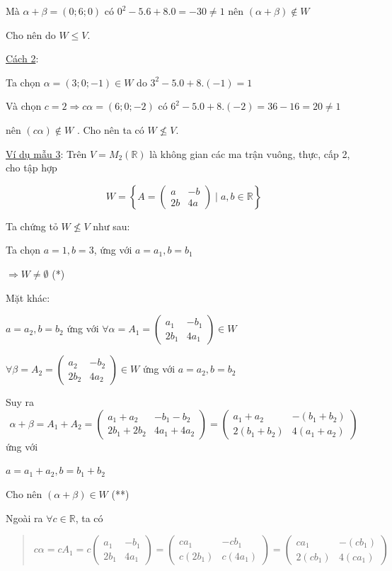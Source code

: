 \documentclass[12pt,a4paper]{article}
\begin{document}
Mà $\alpha + \beta = (0; 6; 0)$ có
$0^2 - 5.6 + 8.0 = -30 \neq 1$ nên
$(\alpha + \beta) \notin W$

Cho nên do $W \le V$.

\ul{Cách 2}:

Ta chọn $\alpha = (3; 0; -1) \in W$ do
$3^2 - 5.0 + 8.(-1) = 1$

Và chọn $c = 2 \Rightarrow c\alpha = (6; 0; -2)$ có
$6^2 - 5.0 + 8.(-2) = 36 - 16 = 20 \neq 1$

nên $(c\alpha) \notin W$ . Cho nên
ta có $W \not\le V$.

\ul{Ví dụ mẫu 3}: Trên
$V = M_2(\mathbb{R})$ là không gian
các ma trận vuông, thực, cấp 2, cho tập hợp

\[ W = \left\{ A = \begin{pmatrix} a & -b \\ 2b & 4a \end{pmatrix} \mid a, b \in \mathbb{R} \right\} \]

Ta chứng tỏ $W \not\le V$ như
sau:

Ta chọn $a=1, b=3$, ứng
với $a=a_1, b=b_1$

$\Rightarrow W \neq \emptyset$ (*)

Mặt khác:

$a=a_2, b=b_2$ ứng với
$\forall \alpha = A_1 = \begin{pmatrix} a_1 & -b_1 \\ 2b_1 & 4a_1 \end{pmatrix} \in W$

$\forall \beta = A_2 = \begin{pmatrix} a_2 & -b_2 \\ 2b_2 & 4a_2 \end{pmatrix} \in W$ ứng với
$a=a_2, b=b_2$

Suy ra \[ \alpha + \beta = A_1 + A_2 = \begin{pmatrix} a_1+a_2 & -b_1-b_2 \\ 2b_1+2b_2 & 4a_1+4a_2 \end{pmatrix} = \begin{pmatrix} a_1+a_2 & -(b_1+b_2) \\ 2(b_1+b_2) & 4(a_1+a_2) \end{pmatrix} \] ứng với

$a=a_1+a_2, b=b_1+b_2$

Cho nên $(\alpha + \beta) \in W$ (**)

Ngoài ra $\forall c \in \mathbb{R}$, ta có

\begin{quote}
\[ c\alpha = cA_1 = c \begin{pmatrix} a_1 & -b_1 \\ 2b_1 & 4a_1 \end{pmatrix} = \begin{pmatrix} ca_1 & -cb_1 \\ c(2b_1) & c(4a_1) \end{pmatrix} = \begin{pmatrix} ca_1 & -(cb_1) \\ 2(cb_1) & 4(ca_1) \end{pmatrix} \]
\end{quote}
\end{document}

